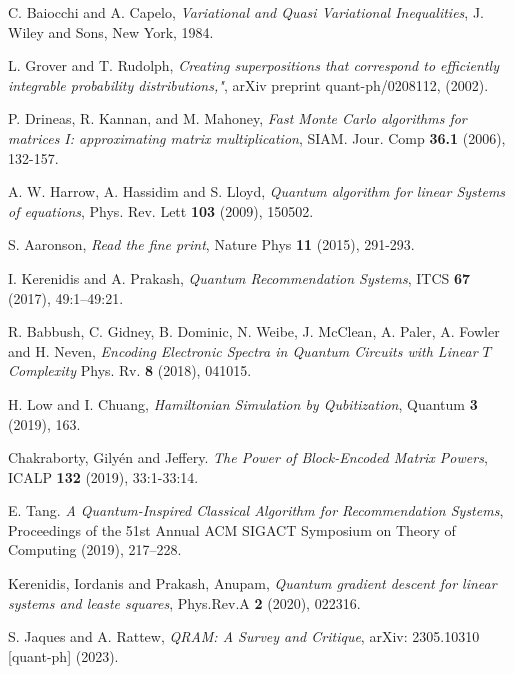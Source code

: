 \documentclass[10pt,twoside,reqno]{amsart} %
\theoremstyle{plain}
\theoremstyle{definition}
\begin{document}
\bigskip

\begin{thebibliography}{0}

C. Baiocchi and A. Capelo, 
{\it Variational and Quasi Variational Inequalities}, 
J. Wiley and Sons, 
New York, 
1984.

L. Grover and T. Rudolph,
{\it Creating superpositions that correspond to efficiently integrable
probability distributions,"},
arXiv preprint quant-ph/0208112, (2002).

P. Drineas, R. Kannan, and M. Mahoney,
{\it Fast Monte Carlo algorithms for matrices I: approximating matrix 
multiplication},
SIAM. Jour. Comp
{\bf 36.1} (2006),
132-157.

A. W. Harrow, A. Hassidim and S. Lloyd,
{\it Quantum algorithm for linear Systems of equations},
Phys. Rev. Lett
{\bf 103} (2009),
150502.

S. Aaronson,
{\it Read the fine print},
Nature Phys
{\bf 11} (2015),
291-293.

I. Kerenidis and A. Prakash,
{\it Quantum Recommendation Systems},
ITCS
{\bf 67} (2017),
49:1--49:21.

R. Babbush, C. Gidney, B. Dominic, N. Weibe, J. McClean, A. Paler, A. Fowler
and H. Neven,
{\it Encoding Electronic Spectra in Quantum Circuits with Linear $T$ Complexity}
Phys. Rv.
{\bf 8} (2018),
041015.

H. Low and I. Chuang,
{\it Hamiltonian Simulation by Qubitization},
Quantum
{\bf 3} (2019),
163.

Chakraborty, Gily{\'en} and Jeffery. {\it The Power of Block-Encoded Matrix
Powers}, ICALP {\bf 132} (2019), 33:1-33:14.

E. Tang. {\it A Quantum-Inspired Classical Algorithm for Recommendation Systems},
Proceedings of the 51st Annual ACM SIGACT Symposium on Theory of Computing (2019),
217--228.

Kerenidis, Iordanis and Prakash, Anupam, 
{\it Quantum gradient descent for linear systems and leaste squares}, 
Phys.Rev.A {\bf 2} (2020), 
022316.

S. Jaques and A. Rattew,
{\it QRAM: A Survey and Critique},
arXiv: 2305.10310 [quant-ph] (2023).


\end{thebibliography}
\end{document}
